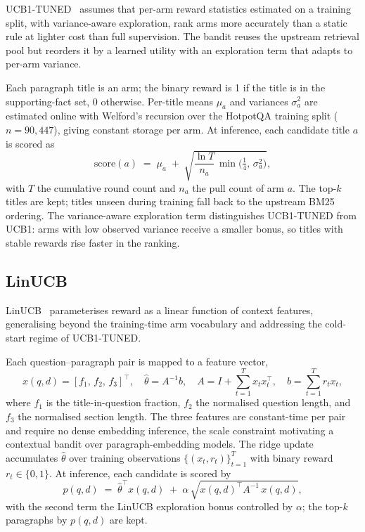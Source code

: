 \documentclass[runningheads]{llncs}
\begin{document}
UCB1-TUNED~\cite{auer2002ucb1} assumes that per-arm reward statistics estimated on a training split, with variance-aware exploration, rank arms more accurately than a static rule at lighter cost than full supervision. The bandit reuses the upstream retrieval pool but reorders it by a learned utility with an exploration term that adapts to per-arm variance.

Each paragraph title is an arm; the binary reward is 1 if the title is in the supporting-fact set, 0 otherwise. Per-title means $\mu_a$ and variances $\sigma_a^2$ are estimated online with Welford's recursion over the HotpotQA training split ($n{=}90{,}447$), giving constant storage per arm. At inference, each candidate title $a$ is scored as
\begin{equation}
\label{eq:ucb1tuned}
\mathrm{score}(a) \;=\; \mu_a \;+\; \sqrt{\frac{\ln T}{n_a}\,\min\!\bigl(\tfrac{1}{4},\,\sigma_a^2\bigr)},
\end{equation}
with $T$ the cumulative round count and $n_a$ the pull count of arm $a$. The top-$k$ titles are kept; titles unseen during training fall back to the upstream BM25 ordering. The variance-aware exploration term distinguishes UCB1-TUNED from UCB1: arms with low observed variance receive a smaller bonus, so titles with stable rewards rise faster in the ranking.

\subsection{LinUCB}
\label{subsec:methods_linucb}

LinUCB~\cite{chu2011linucb} parameterises reward as a linear function of context features, generalising beyond the training-time arm vocabulary and addressing the cold-start regime of UCB1-TUNED.

Each question--paragraph pair is mapped to a feature vector,
\begin{equation}
\label{eq:linucb_features}
x(q,d) = [f_1,\, f_2,\, f_3]^\top,\quad \hat{\theta} = A^{-1}b,\quad A = I + \sum_{t=1}^{T} x_t x_t^\top,\quad b = \sum_{t=1}^{T} r_t x_t,
\end{equation}
where $f_1$ is the title-in-question fraction, $f_2$ the normalised question length, and $f_3$ the normalised section length. The three features are constant-time per pair and require no dense embedding inference, the scale constraint motivating a contextual bandit over paragraph-embedding models. The ridge update accumulates $\hat{\theta}$ over training observations $\{(x_t,r_t)\}_{t=1}^{T}$ with binary reward $r_t\in\{0,1\}$. At inference, each candidate is scored by
\begin{equation}
\label{eq:linucb_score}
p(q,d) \;=\; \hat{\theta}^\top x(q,d) \;+\; \alpha\,\sqrt{x(q,d)^\top A^{-1}\, x(q,d)},
\end{equation}
with the second term the LinUCB exploration bonus controlled by $\alpha$; the top-$k$ paragraphs by $p(q,d)$ are kept.
\end{document}
